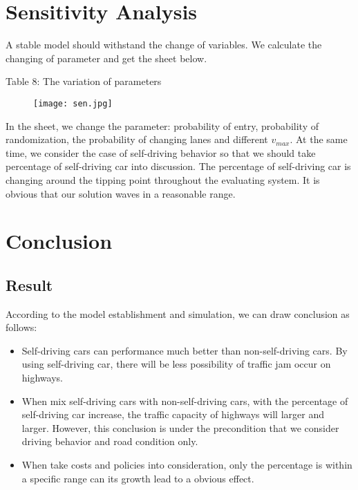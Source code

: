 \documentclass{mcmthesis}
\numberwithin{equation}{section}
\begin{document}
	\section{Sensitivity Analysis}
		A stable model should withstand the change of variables. We calculate the changing of parameter and get the sheet below.
		\newpage
		\begin{center}
			Table 8: The variation of parameters
		\end{center}
		\begin{figure}[H]
			\begin{center}
				\texttt{[image: sen.jpg]}
				\caption*{}
			\end{center}
		\end{figure}

		In the sheet, we change the parameter: probability of entry, probability of randomization, the probability of changing lanes and different $v_{max}$. At the same time, we consider the case of self-driving behavior so that we should take percentage of self-driving car into discussion. The percentage of self-driving car is changing around the tipping point throughout the evaluating system. It is obvious that our solution waves in a reasonable range.


	\section{Conclusion}
		\subsection{Result}
			According to the model establishment and simulation, we can draw conclusion as follows: 
			\begin{itemize}
				\item Self-driving cars can performance much better than non-self-driving cars. By using self-driving car, there will be less possibility of traffic jam occur on highways. 
				\item When mix self-driving cars with non-self-driving cars, with the percentage of self-driving car increase, the traffic capacity of highways will larger and larger. However, this conclusion is under the precondition that we consider driving behavior and road condition only.
				\item When take costs and policies into consideration, only the percentage is within a specific range can its growth lead to a obvious effect.
			\end{itemize}
\end{document}
